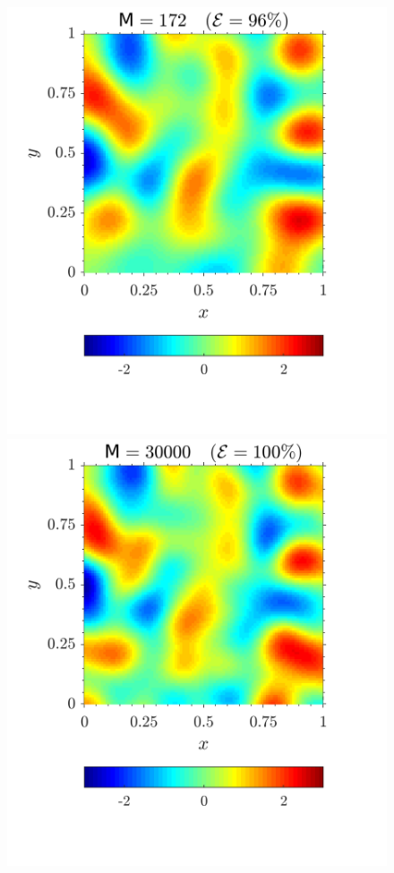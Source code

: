 \begin{figure}[H]
{ \includegraphics[scale=0.5]{figuras/Y_sexp_01_E96.png}\includegraphics[scale=0.5]{figuras/Y_sexp_01_E100.png}
}
\end{figure}

